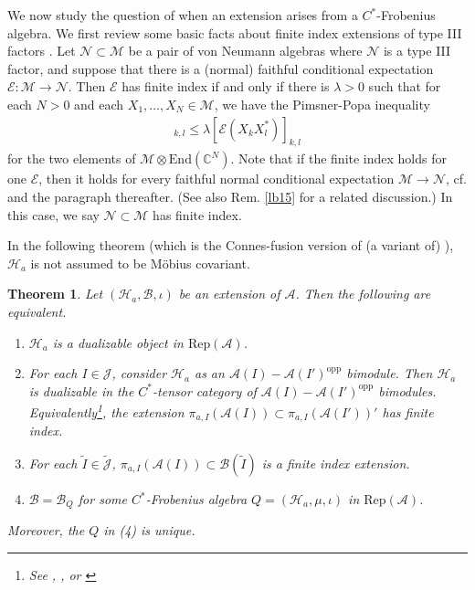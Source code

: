 \documentclass[11pt,b5paper,notitlepage]{article}
\theoremstyle{definition}
\theoremstyle{plain}
\newtheorem{thm}[df]{Theorem}
\newcommand{\mc}{\mathcal}
\newcommand{\wtd}{\widetilde}
\newcommand{\End}{\mathrm{End}} %
\newcommand{\opp}{\mathrm{opp}}
\newcommand{\Jtd}{\widetilde{\mathcal J}}
\newcommand{\RepA}{\mathrm{Rep}(\mathcal A)}
\newcommand{\Cbb}{\mathbb C}
\numberwithin{equation}{section}
\begin{document}
We now study the question of when an extension arises from a $C^*$-Frobenius algebra. We first review some basic facts about finite index extensions of type III factors \cite{Lon89,Lon90,Kos98,BDH14}. Let $\mc N\subset\mc M$ be a pair of von Neumann algebras where $\mc N$ is a type III factor, and suppose that there is a (normal) faithful conditional expectation $\mc E:\mc M\rightarrow\mc N$. Then  $\mc E$ has finite index if and only if  there is $\lambda>0$ such that  for each $N>0$ and each $X_1,\dots,X_N\in\mc M$, we have the Pimsner-Popa inequality
\begin{align}
[X_k X_l^*]_{k,l}\leq \lambda [\mc E(X_k X_l^*)]_{k,l}	\label{eq13}
\end{align}
for the two elements of $\mc M\otimes\End(\Cbb^N)$. Note that if the finite index holds for one $\mc E$, then it holds for every faithful normal conditional expectation $\mc M\rightarrow\mc N$, cf. \cite[Prop. 5.4]{Lon89} and the paragraph thereafter. (See also Rem. \ref{lb15} for a related discussion.) In this case, we say $\mc N\subset\mc M$ has finite index. %


In the following theorem (which is the Connes-fusion version of (a variant of) \cite[Thm. 4.9]{LR95}), $\mc H_a$ is not assumed to be M\"obius covariant. 


\begin{thm}\label{lb11}
Let $(\mc H_a,\mc B,\iota)$ be an extension of $\mc A$. Then the following are equivalent.
\begin{enumerate}[label=(\arabic*)]
\item $\mc H_a$ is a dualizable object in $\RepA$.
\item For each $I\in\mc J$, consider $\mc H_a$ as an $\mc A(I)-\mc A(I')^\opp$ bimodule. Then  $\mc H_a$ is dualizable in the $C^*$-tensor category of $\mc A(I)-\mc A(I')^\opp$ bimodules. Equivalently\footnote{See \cite{Lon90}, \cite[Sec. 2.7]{LR95}, or \cite[Sec. 7]{BDH14}}, the extension $\pi_{a,I}(\mc A(I))\subset \pi_{a,I}(\mc A(I'))'$ has finite index.
\item For each $\wtd I \in\Jtd$, $\pi_{a,I}(\mc A(I))\subset\mc B(\wtd I)$ is a finite index extension.
\item $\mc B=\mc B_Q$ for some $C^*$-Frobenius algebra $Q=(\mc H_a,\mu,\iota)$ in $\RepA$.
\end{enumerate} 	
Moreover, the $Q$ in (4) is unique.
\end{thm}	
\end{document}
